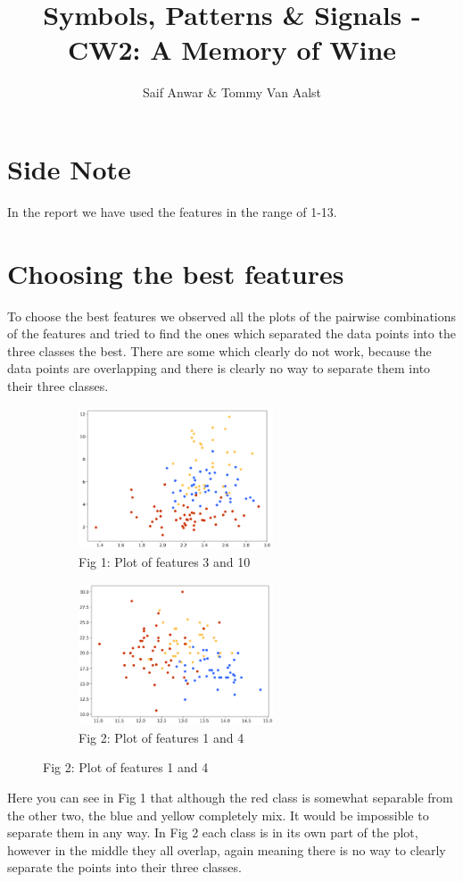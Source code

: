 \documentclass[11pt]{article}
\begin{document}
\title{Symbols, Patterns \& Signals - CW2: A Memory of Wine}
\author{Saif Anwar \& Tommy Van Aalst}
\date{}
\maketitle


\section*{Side Note}
In the report we have used the features in the range of 1-13.

\section*{Choosing the best features}

To choose the best features we observed all the plots of the pairwise combinations of the features and tried to find the ones which separated the data points into the three classes the best.
There are some which clearly do not work, because the data points are overlapping and there is clearly no way to separate them into their three classes.

\begin{figure}[h!]
\captionsetup[subfigure]{labelformat=empty}
\begin{subfigure}{.5\textwidth}
\centering
\includegraphics[height=4.2cm]{3and10.png}
\caption{Fig 1: Plot of features 3 and 10}
\end{subfigure}%
\begin{subfigure}{.5\textwidth}
\centering
\includegraphics[height=4.2cm]{1and4.png}
\caption{Fig 2: Plot of features 1 and 4}
\end{subfigure}%
\end{figure}
\noindent
Here you can see in Fig 1 that although the red class is somewhat separable from the other two, the blue and yellow completely mix. It would be impossible to separate them in any way. In Fig 2 each class is in its own part of the plot, however in the middle they all overlap, again meaning there is no way to clearly separate the points into their three classes.\\
\end{document}
